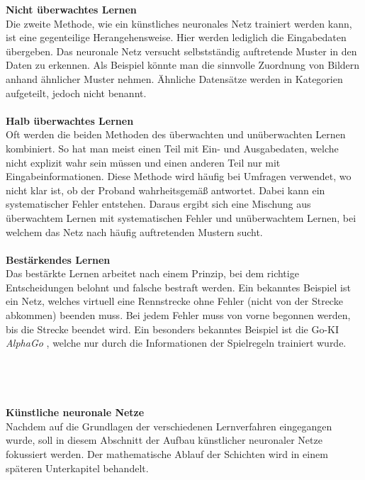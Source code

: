 \textbf{Nicht überwachtes Lernen}\\
Die zweite Methode, wie ein künstliches neuronales Netz trainiert werden kann, ist eine gegenteilige Herangehensweise. Hier werden lediglich die Eingabedaten übergeben. Das neuronale Netz versucht selbstständig auftretende Muster in den Daten zu erkennen. Als Beispiel könnte man die sinnvolle Zuordnung von Bildern anhand ähnlicher Muster nehmen. Ähnliche Datensätze werden in Kategorien aufgeteilt, jedoch nicht benannt.\\\\
\textbf{Halb überwachtes Lernen}\\
Oft werden die beiden Methoden des überwachten und unüberwachten Lernen kombiniert. So hat man meist einen Teil mit Ein- und Ausgabedaten, welche nicht explizit wahr sein müssen und einen anderen Teil nur mit Eingabeinformationen. Diese Methode wird häufig bei Umfragen verwendet, wo nicht klar ist, ob der Proband wahrheitsgemäß antwortet. Dabei kann ein systematischer Fehler entstehen. Daraus ergibt sich eine Mischung aus überwachtem Lernen mit systematischen Fehler und unüberwachtem Lernen, bei welchem das Netz nach häufig auftretenden Mustern sucht.\\\\
\textbf{Bestärkendes Lernen}\\ 
Das bestärkte Lernen arbeitet nach einem Prinzip, bei dem richtige Entscheidungen belohnt und falsche bestraft werden. Ein bekanntes Beispiel ist ein Netz, welches virtuell eine Rennstrecke ohne Fehler (nicht von der Strecke abkommen) beenden muss. Bei jedem Fehler muss von vorne begonnen werden, bis die Strecke beendet wird. Ein besonders bekanntes Beispiel ist die Go-KI \textit{AlphaGo} \cite{Alpha2016GO}, welche nur durch die Informationen der Spielregeln trainiert wurde.\\\\\\\\\\
\textbf{Künstliche neuronale Netze}\\
Nachdem auf die Grundlagen der verschiedenen Lernverfahren eingegangen wurde, soll in diesem Abschnitt der Aufbau künstlicher neuronaler Netze fokussiert werden. Der mathematische Ablauf der Schichten wird in einem späteren Unterkapitel behandelt.\\
